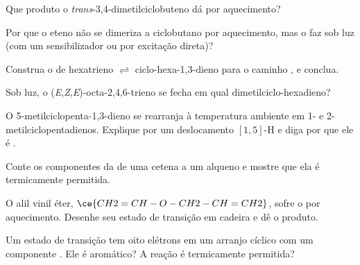 \begin{exercise}[$\star$]\label{exo:b3:pericyclic:3}
Que produto o \textit{trans}-3,4-dimetilciclobuteno dá por aquecimento?
\end{exercise}

\begin{exercise}[$\star$]\label{exo:b3:pericyclic:4}
Por que o eteno não se dimeriza a ciclobutano por aquecimento, mas o faz sob luz
(com um sensibilizador ou por excitação direta)?
\end{exercise}

\begin{exercise}[$\star\star$]\label{exo:b3:pericyclic:5}
Construa o  de hexatrieno $\rightleftharpoons$ ciclo-hexa-1,3-dieno para o
caminho , e conclua.
\end{exercise}

\begin{exercise}[$\star\star$]\label{exo:b3:pericyclic:6}
Sob luz, o (\textit{E},\textit{Z},\textit{E})-octa-2,4,6-trieno se fecha em qual dimetilciclo-hexadieno?
\end{exercise}

\begin{exercise}[$\star\star$]\label{exo:b3:pericyclic:7}
O 5-metilciclopenta-1,3-dieno se rearranja à temperatura ambiente em 1- e
2-metilciclopentadienos. Explique por um deslocamento $[1,5]$-H e diga por que ele é .
\end{exercise}

\begin{exercise}[$\star\star$]\label{exo:b3:pericyclic:8}
Conte os componentes da  de uma cetena a um alqueno e mostre
que ela é termicamente permitida.
\end{exercise}

\begin{exercise}[$\star\star$]\label{exo:b3:pericyclic:9}
O alil vinil éter, $\ce{CH2=CH-O-CH2-CH=CH2}$, sofre o  por
aquecimento. Desenhe seu estado de transição em cadeira e dê o produto.
\end{exercise}

\begin{exercise}[$\star\star\star$]\label{exo:b3:pericyclic:10}
Um estado de transição tem oito elétrons em um arranjo cíclico com um componente
. Ele é aromático? A reação é termicamente permitida?
\end{exercise}

